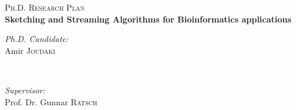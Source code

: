 \begin{titlepage}

\newcommand{\HRule}{\rule{\linewidth}{0.5mm}} %

\center %
 
\textsc{\LARGE Ph.D. Research Plan}\\[1.5cm] 


\vspace{1.4cm}
\setlength{\baselineskip}{25pt}
{ \huge \bfseries Sketching and Streaming Algorithms for Bioinformatics applications}
 
\vspace{3cm}

\begin{minipage}{0.4\textwidth}
\begin{flushleft} \large
\emph{Ph.D. Candidate:}\\
Amir \textsc{Joudaki} %
\end{flushleft}
\end{minipage}
~
\begin{minipage}{0.4\textwidth}
\begin{flushright} \large
\emph{Supervisor:} \\
Prof. Dr. Gunnar  \textsc{R\"{a}tsch} %
\end{flushright}
\end{minipage}\\[4cm]


\end{titlepage}
